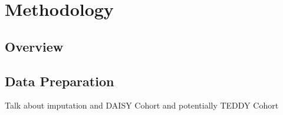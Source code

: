 \documentclass{article}\usepackage[]{graphicx}\usepackage[]{color}
\begin{document}
\section{Methodology}
\subsection{Overview}
\subsection{Data Preparation}
Talk about imputation and DAISY Cohort and potentially TEDDY Cohort
\end{document}
